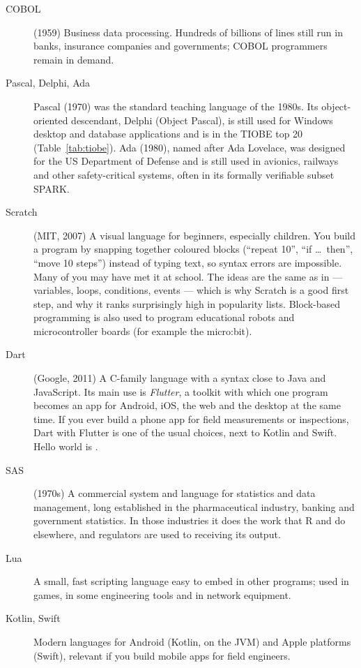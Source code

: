 \begin{description}
\item[COBOL] (1959) Business data processing. Hundreds of billions of lines still run in
  banks, insurance companies and governments; COBOL programmers remain in demand.
\item[Pascal, Delphi, Ada] Pascal (1970) was the standard teaching language of the 1980s.
  Its object-oriented descendant, Delphi (Object Pascal), is still used for Windows desktop
  and database applications and is in the TIOBE top 20 (Table~\ref{tab:tiobe}).
  Ada (1980), named after Ada Lovelace, was designed for the US Department of Defense and is
  still used in avionics, railways and other safety-critical systems, often in its
  formally verifiable subset SPARK.
\item[Scratch] (MIT, 2007) A visual language for beginners, especially children. You build a
  program by snapping together coloured blocks (``repeat 10'', ``if \ldots\ then'', ``move 10
  steps'') instead of typing text, so syntax errors are impossible. Many of you may have met
  it at school. The ideas are the same as in \py --- variables, loops, conditions, events
  --- which is why Scratch is a good first step, and why it ranks surprisingly high in
  popularity lists. Block-based programming is also used to program educational robots and
  microcontroller boards (for example the micro:bit).
\item[Dart] (Google, 2011) A C-family language with a syntax close to Java and JavaScript.
  Its main use is \emph{Flutter}, a toolkit with which one program becomes an app for
  Android, iOS, the web and the desktop at the same time. If you ever build a phone app
  for field measurements or inspections, Dart with Flutter is one of the usual choices,
  next to Kotlin and Swift. Hello world is .
\item[SAS] (1970s) A commercial system and language for statistics and data management,
  long established in the pharmaceutical industry, banking and government statistics. In
  those industries it does the work that R and \py do elsewhere, and regulators are used to
  receiving its output.
\item[Lua] A small, fast scripting language easy to embed in other programs; used in
  games, in some engineering tools and in network equipment.
\item[Kotlin, Swift] Modern languages for Android (Kotlin, on the JVM) and Apple platforms
  (Swift), relevant if you build mobile apps for field engineers.

\end{description}
